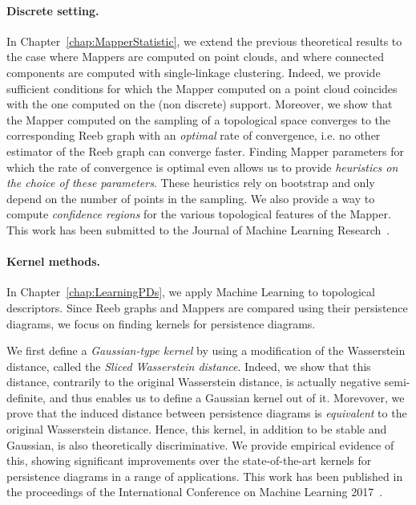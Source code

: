 \paragraph*{Discrete setting.} In Chapter~\ref{chap:MapperStatistic}, we extend the previous theoretical results to 
the case where Mappers are computed on point clouds, and
where connected components are computed with single-linkage clustering. Indeed, we provide sufficient conditions for which the Mapper computed on
a point cloud coincides with the one computed on the (non discrete) support. 
Moreover, we show that the Mapper computed on the sampling of a topological space converges to the corresponding Reeb graph with an {\em optimal}
rate of convergence, i.e. no other estimator of the Reeb graph can converge faster. 
Finding Mapper parameters for which the rate of convergence is optimal even allows us 
to provide {\em heuristics on the choice of these parameters}. These heuristics rely on bootstrap and only depend on the number of points in the sampling. 
We also provide a way to compute {\em confidence regions} for the various topological features of the Mapper.
This work has been submitted to the Journal of Machine Learning Research~\cite{Carriere17c}.

\paragraph*{Kernel methods.} In Chapter~\ref{chap:LearningPDs}, we apply Machine Learning to topological descriptors. 
Since Reeb graphs and Mappers are compared using their persistence diagrams, we focus on finding kernels for persistence diagrams.

We first define a {\em Gaussian-type kernel} by using a modification of the Wasserstein distance, called the {\em Sliced Wasserstein distance}.
Indeed, we show that this distance, contrarily to the original Wasserstein distance, is actually negative semi-definite, and thus enables us to define
a Gaussian kernel out of it. Morevover, we prove 
that the induced distance between persistence diagrams 
is {\em equivalent} to the original Wasserstein distance. 
Hence, this kernel, in addition to be stable and Gaussian, is also theoretically discriminative.
We provide empirical evidence of this, showing significant improvements over the state-of-the-art kernels
for persistence diagrams in a range of applications. This work has been published in the proceedings of the International Conference on Machine Learning 2017~\cite{Carriere17e}.

